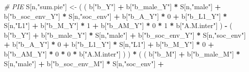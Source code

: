 \documentclass[
]{book}
\newenvironment{Shaded}{\begin{snugshade}}{\end{snugshade}}
\newcommand{\CommentTok}[1]{\textcolor[rgb]{0.56,0.35,0.01}{\textit{#1}}}
\newcommand{\DecValTok}[1]{\textcolor[rgb]{0.00,0.00,0.81}{#1}}
\newcommand{\NormalTok}[1]{#1}
\newcommand{\OtherTok}[1]{\textcolor[rgb]{0.56,0.35,0.01}{#1}}
\newcommand{\SpecialCharTok}[1]{\textcolor[rgb]{0.81,0.36,0.00}{\textbf{#1}}}
\newcommand{\StringTok}[1]{\textcolor[rgb]{0.31,0.60,0.02}{#1}}
\begin{document}
\begin{Shaded}
\begin{Highlighting}[]
    \CommentTok{\# PIE }
\NormalTok{    S[n,}\StringTok{"sum.pie"}\NormalTok{] }\OtherTok{\textless{}{-}}\NormalTok{ ( ( b[}\StringTok{"b\_Y"}\NormalTok{] }\SpecialCharTok{+} 
\NormalTok{                            b[}\StringTok{"b\_male\_Y"}\NormalTok{] }\SpecialCharTok{*}\NormalTok{ S[n,}\StringTok{"male"}\NormalTok{] }\SpecialCharTok{+} 
\NormalTok{                            b[}\StringTok{"b\_soc\_env\_Y"}\NormalTok{] }\SpecialCharTok{*}\NormalTok{ S[n,}\StringTok{"soc\_env"}\NormalTok{] }\SpecialCharTok{+} 
\NormalTok{                            b[}\StringTok{"b\_A\_Y"}\NormalTok{] }\SpecialCharTok{*} \DecValTok{0} \SpecialCharTok{+} 
\NormalTok{                            b[}\StringTok{"b\_L1\_Y"}\NormalTok{] }\SpecialCharTok{*}\NormalTok{ S[n,}\StringTok{"L1"}\NormalTok{] }\SpecialCharTok{+}
\NormalTok{                            b[}\StringTok{"b\_M\_Y"}\NormalTok{] }\SpecialCharTok{*} \DecValTok{1} \SpecialCharTok{+}
\NormalTok{                            b[}\StringTok{"b\_AM\_Y"}\NormalTok{] }\SpecialCharTok{*} \DecValTok{0} \SpecialCharTok{*} \DecValTok{1} \SpecialCharTok{*}\NormalTok{ b[}\StringTok{"A.M.inter"}\NormalTok{] ) }\SpecialCharTok{{-}} 
\NormalTok{                          ( b[}\StringTok{"b\_Y"}\NormalTok{] }\SpecialCharTok{+} 
\NormalTok{                              b[}\StringTok{"b\_male\_Y"}\NormalTok{] }\SpecialCharTok{*}\NormalTok{ S[n,}\StringTok{"male"}\NormalTok{] }\SpecialCharTok{+} 
\NormalTok{                              b[}\StringTok{"b\_soc\_env\_Y"}\NormalTok{] }\SpecialCharTok{*}\NormalTok{ S[n,}\StringTok{"soc\_env"}\NormalTok{] }\SpecialCharTok{+} 
\NormalTok{                              b[}\StringTok{"b\_A\_Y"}\NormalTok{] }\SpecialCharTok{*} \DecValTok{0} \SpecialCharTok{+} 
\NormalTok{                              b[}\StringTok{"b\_L1\_Y"}\NormalTok{] }\SpecialCharTok{*}\NormalTok{ S[n,}\StringTok{"L1"}\NormalTok{] }\SpecialCharTok{+}
\NormalTok{                              b[}\StringTok{"b\_M\_Y"}\NormalTok{] }\SpecialCharTok{*} \DecValTok{0} \SpecialCharTok{+}
\NormalTok{                              b[}\StringTok{"b\_AM\_Y"}\NormalTok{] }\SpecialCharTok{*} \DecValTok{0} \SpecialCharTok{*} \DecValTok{0} \SpecialCharTok{*}\NormalTok{ b[}\StringTok{"A.M.inter"}\NormalTok{] ) ) }\SpecialCharTok{*}
\NormalTok{      ( ( b[}\StringTok{"b\_M"}\NormalTok{] }\SpecialCharTok{+} 
\NormalTok{            b[}\StringTok{"b\_male\_M"}\NormalTok{] }\SpecialCharTok{*}\NormalTok{ S[n,}\StringTok{"male"}\NormalTok{] }\SpecialCharTok{+} 
\NormalTok{            b[}\StringTok{"b\_soc\_env\_M"}\NormalTok{] }\SpecialCharTok{*}\NormalTok{ S[n,}\StringTok{"soc\_env"}\NormalTok{] }\SpecialCharTok{+} 

\end{Highlighting}
\end{Shaded}
\end{document}
